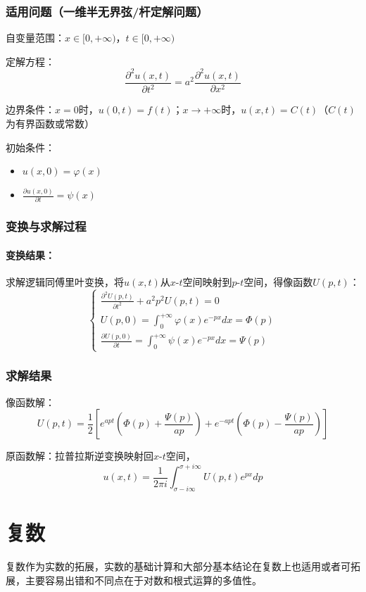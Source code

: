 \documentclass{article}
\begin{document}
	\subsubsection{适用问题（一维半无界弦/杆定解问题）}
	自变量范围：\(x \in [0,+\infty)\)，\(t \in [0,+\infty)\)
	
	定解方程：
	\[
	\frac{\partial^2 u(x,t)}{\partial t^2} = a^2 \frac{\partial^2 u(x,t)}{\partial x^2}
	\]
	
	边界条件：\(x = 0\)时，\(u(0,t) = f(t)\)；\(x \to +\infty\)时，\(u(x,t) = C(t)\)（\(C(t)\)为有界函数或常数）
	
	初始条件：
	\begin{itemize}
		\item \(u(x,0) = \varphi(x)\)
		\item \(\frac{\partial u(x,0)}{\partial t} = \psi(x)\)
	\end{itemize}
	
	\subsubsection{变换与求解过程}
	
	\paragraph{变换结果：}求解逻辑同傅里叶变换，将\(u(x,t)\)从\(x\text{-}t\)空间映射到\(p\text{-}t\)空间，得像函数\(U(p,t)\)：
	\[
	\begin{cases}
		\frac{\partial^2 U(p,t)}{\partial t^2} + a^2 p^2 U(p,t) = 0 \\
		U(p,0) = \int_{0}^{+\infty} \varphi(x) e^{-px} dx = \Phi(p) \\
		\frac{\partial U(p,0)}{\partial t} = \int_{0}^{+\infty} \psi(x) e^{-px} dx = \Psi(p)
	\end{cases}
	\]
	
	
	\subsubsection{求解结果}
	
	像函数解：
	\[
	U(p,t) = \frac{1}{2} \left[ e^{apt} \left( \Phi(p) + \frac{\Psi(p)}{ap} \right) + e^{-apt} \left( \Phi(p) - \frac{\Psi(p)}{ap} \right) \right]
	\]
	
	原函数解：拉普拉斯逆变换映射回\(x\text{-}t\)空间，
	\[
	u(x,t) = \frac{1}{2\pi i} \int_{\sigma - i\infty}^{\sigma + i\infty} U(p,t) e^{px} dp
	\]
			
						
	\section{复数}
	复数作为实数的拓展，实数的基础计算和大部分基本结论在复数上也适用或者可拓展，主要容易出错和不同点在于对数和根式运算的多值性。
\end{document}
